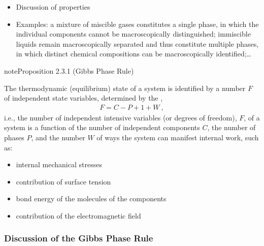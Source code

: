 \documentclass[letterpaper,10pt,english]{jupyterBook}
\begin{document}
\sphinxAtStartPar
{}
\begin{itemize}
\item {} 
\sphinxAtStartPar
Discussion of properties

\item {} 
\sphinxAtStartPar
Examples: a mixture of miscible gases constitutes a single phase, in which the individual components cannot be macroscopically distinguished; immiscible liquids remain macroscopically separated and thus constitute multiple phases, in which distinct chemical compositions can be macroscopically identified;…

\end{itemize}
\label{ch/principles-gibbs-phase-rule:proposition-4}
\begin{sphinxadmonition}{note}{Proposition 2.3.1 (Gibbs Phase Rule)}



\sphinxAtStartPar
The thermodynamic (equilibrium) state of a system is identified by a number \(F\) of independent  state variables, determined by the ,
\begin{equation*}
\begin{split}F = C - P + 1 + W \ ,\end{split}
\end{equation*}
\sphinxAtStartPar
i.e., the number of independent intensive variables (or degrees of freedom), \(F\), of a system is a function of the number of independent components \(C\), the number of phases \(P\), and the number \(W\) of ways the system can manifest internal work, such as:
\begin{itemize}
\item {} 
\sphinxAtStartPar
internal mechanical stresses

\item {} 
\sphinxAtStartPar
contribution of surface tension

\item {} 
\sphinxAtStartPar
bond energy of the molecules of the components

\item {} 
\sphinxAtStartPar
contribution of the electromagnetic field

\end{itemize}
\end{sphinxadmonition}
\subsubsection*{Discussion of the Gibbs Phase Rule}
\end{document}
